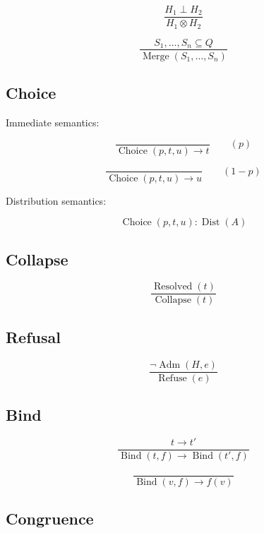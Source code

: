 \documentclass[12pt,oneside]{article}
\theoremstyle{definition}
\theoremstyle{remark}
\begin{document}
\[
\frac
{H_1\perp H_2}
{H_1\otimes H_2}
\]

\[
\frac
{S_1,\ldots,S_n
\subseteq
Q}
{\operatorname{Merge}(S_1,\ldots,S_n)}
\]

\subsection*{Choice}

Immediate semantics:

\[
\frac{}
{\operatorname{Choice}(p,t,u)
\longrightarrow
t}
\qquad
(p)
\]

\[
\frac{}
{\operatorname{Choice}(p,t,u)
\longrightarrow
u}
\qquad
(1-p)
\]

Distribution semantics:

\[
\operatorname{Choice}(p,t,u)
:
\operatorname{Dist}(A)
\]

\subsection*{Collapse}

\[
\frac
{\operatorname{Resolved}(t)}
{\operatorname{Collapse}(t)}
\]

\subsection*{Refusal}

\[
\frac
{\neg
\operatorname{Adm}(H,e)}
{\operatorname{Refuse}(e)}
\]

\subsection*{Bind}

\[
\frac
{t\longrightarrow t'}
{\operatorname{Bind}(t,f)
\longrightarrow
\operatorname{Bind}(t',f)}
\]

\[
\frac
{}
{\operatorname{Bind}(v,f)
\longrightarrow
f(v)}
\]

\subsection*{Congruence}
\end{document}

